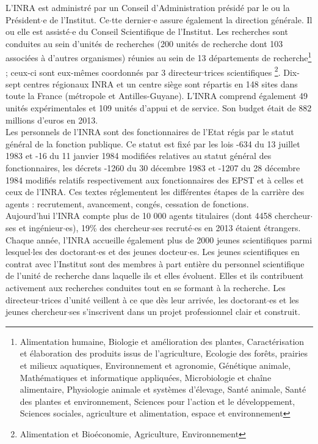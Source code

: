 L'INRA est administr\'e par un Conseil d'Administration pr\'esid\'e par le ou la Pr\'esident$\cdot$e de l'Institut. Ce$\cdot$tte dernier$\cdot$e assure \'egalement la direction g\'en\'erale. Il ou elle est assist\'e$\cdot$e du Conseil Scientifique de l'Institut. Les recherches sont conduites au sein d'unit\'es de recherches (200 unit\'es de recherche dont 103 associ\'ees \`a d'autres organismes) r\'eunies au sein de 13 d\'epartements de recherche\footnote{Alimentation humaine, Biologie et am\'elioration des plantes, Caract\'erisation et \'elaboration des produits issus de l'agriculture, Ecologie des for\^ets, prairies et milieux aquatiques, Environnement et agronomie, G\'en\'etique animale, Math\'ematiques et informatique appliqu\'ees, Microbiologie et cha\^ine alimentaire, Physiologie animale et syst\`emes d'\'elevage, Sant\'e animale, Sant\'e des plantes et environnement, Sciences pour l'action et le d\'eveloppement, Sciences sociales, agriculture et alimentation, espace et environnement} ; ceux-ci sont eux-m\^emes coordonn\'es par 3 directeur$\cdot$trices scientifiques \footnote{Alimentation et Bio\'economie, Agriculture, Environnement}. Dix-sept centres r\'egionaux INRA et un centre si\`ege sont r\'epartis en 148 sites dans toute la France (m\'etropole et Antilles-Guyane). L'INRA comprend \'egalement 49 unit\'es exp\'erimentales et 109 unit\'es d'appui et de service. Son budget \'etait de 882 millions d'euros en 2013.\\

Les personnels de l'INRA sont des fonctionnaires de l'Etat r\'egis par le statut g\'en\'eral de la fonction publique. Ce statut est fix\'e par les lois -634 du 13 juillet 1983 et -16 du 11 janvier 1984 modifi\'ees relatives au statut g\'en\'eral des fonctionnaires, les d\'ecrets -1260 du 30 d\'ecembre 1983 et -1207 du 28 d\'ecembre 1984 modifi\'es relatifs respectivement aux fonctionnaires des EPST et \`a celles et ceux de l'INRA. Ces textes r\'eglementent les diff\'erentes \'etapes de la carri\`ere des agents : recrutement, avancement, cong\'es, cessation de fonctions.\\

Aujourd'hui l'INRA compte plus de 10 000 agents titulaires (dont 4458 chercheur$\cdot$ses et ing\'enieur$\cdot$es), 19\% des chercheur$\cdot$ses recrut\'e$\cdot$es en 2013 \'etaient \'etrangers. Chaque ann\'ee, l'INRA accueille \'egalement plus de 2000 jeunes scientifiques parmi lesquel$\cdot$les des doctorant$\cdot$es et des jeunes docteur$\cdot$es. Les jeunes scientifiques en contrat avec l'Institut sont des membres \`a part enti\`ere du personnel scientifique de l'unit\'e de recherche dans laquelle ils et elles \'evoluent. Elles et ils contribuent activement aux recherches conduites tout en se formant \`a la recherche. Les directeur$\cdot$trices d'unit\'e veillent \`a ce que d\`es leur arriv\'ee, les doctorant$\cdot$es et les jeunes chercheur$\cdot$ses s'inscrivent dans un projet professionnel clair et construit.


